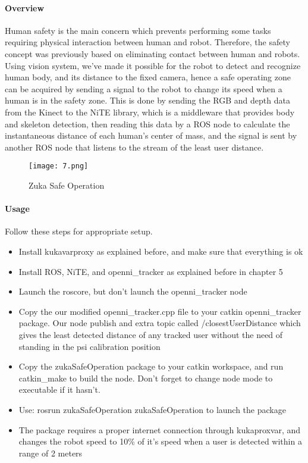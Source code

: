 \paragraph{Overview}
Human safety is the main concern which prevents performing some tasks requiring physical interaction between human and robot. Therefore, the safety concept was previously based on eliminating contact between human and robots.
Using vision system, we’ve made it possible for the robot to detect and recognize human body, and its distance to the fixed camera, hence a safe operating zone can be acquired by sending a signal to the robot to change its speed when a human is in the safety zone.
This is done by sending the RGB and depth data from the Kinect to the NiTE library, which is a middleware that provides body and skeleton detection, then reading this data by a ROS node to calculate the instantaneous distance of each human’s center of mass, and the signal is sent by another ROS node that listens to the stream of the least user distance.


\begin{figure}[H]
	\centering
	\caption{Zuka Safe Operation }
	\texttt{[image: 7.png]}
\end{figure} 
\paragraph{Usage}
Follow these steps for appropriate setup.
\begin{itemize}
	\item Install kukavarproxy as explained before, and make sure that everything is ok
	\item Install ROS, NiTE, and openni\_tracker as explained before in chapter 5
	\item Launch the roscore, but don’t launch the openni\_tracker node
	\item Copy the our modified openni\_tracker.cpp file to your catkin openni\_tracker package. Our node publish and extra topic called /closestUserDistance which gives the least detected distance of any tracked user without the need of standing in the psi calibration position
	\item Copy the zukaSafeOperation package to your catkin workspace, and run catkin\_make to build the node. Don’t forget to change node mode to executable if it hasn’t.
	\item Use: rosrun zukaSafeOperation zukaSafeOperation to launch the package
	\item The package requires a proper internet connection through kukaproxvar, and changes the robot speed to 10\% of it’s speed when a user is detected within a range of 2 meters
	
\end{itemize}

